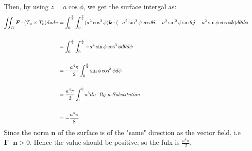 \documentclass[12pt]{article}
\renewcommand{\vec}[1]{\boldsymbol{#1}}
\begin{document}
Then, by using $z = a\cos{\phi}$, we get the surface
intergal as:
\begin{align*}
\iint_D \vec{F} \vec{\cdot} (T_u \times T_v) dudv 
&= \int_{0}^{\frac{\pi}{2}}\int_0^{\frac{\pi}{2}}
(a^2\cos^2{\phi})\vec k \vec{\cdot} (-a^2\sin^2{\phi}\cos{\theta} \vec i - a^2\sin^2{\phi}\sin{\theta}\vec j - a^2 \sin{\phi}\cos{\phi} \vec k) d \theta d \phi \\
&\\
&= \int_{0}^{\frac{\pi}{2}}\int_0^{\frac{\pi}{2}} -a^4\sin{\phi}\cos^3{\phi} d\theta d \phi \\
&\\
&= -\frac{a^4\pi}{2} \int_0^{\frac{\pi}{2}} \sin{\phi}\cos^3{\phi} d\phi\\
&\\
&= \frac{a^4\pi}{2}\int_1^0 u^3 du \hspace*{0.2cm} \textit{By u-Substitution} \\
&\\
&= -\frac{a^4 \pi}{8}
\end{align*}
Since the norm $\vec n$ of the surface is of the "same" direction as the vector field, 
i.e $\vec F \cdot \vec n > 0$. Hence
the value should be positive, so the fulx is
$\displaystyle{\frac{a^4\pi}{2}}$.
\end{document}
